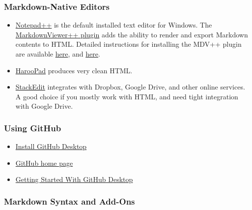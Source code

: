 \documentclass[
]{article}
\providecommand{\tightlist}{%
  \setlength{\itemsep}{0pt}\setlength{\parskip}{0pt}}
\begin{document}
\hypertarget{markdown-native-editors}{%
\subsubsection{Markdown-Native Editors}\label{markdown-native-editors}}

\begin{itemize}
\tightlist
\item
  \href{https://notepad-plus-plus.org/}{Notepad++} is the default
  installed text editor for Windows. The
  \href{https://github.com/nea/MarkdownViewerPlusPlus}{MarkdownViewer++
  plugin} adds the ability to render and export Markdown contents to
  HTML. Detailed instructions for installing the MDV++ plugin are
  available
  \href{https://adamtheautomator.com/convert-markdown-to-html/}{here},
  and
  \href{https://techwombat.com/how-to-install-markdownviewer-plus-plus-plugin-notepad-plus-plus/}{here}.
\item
  \href{http://pad.haroopress.com/}{HarooPad} produces very clean HTML.
\item
  \href{https://stackedit.io/}{StackEdit} integrates with Dropbox,
  Google Drive, and other online services. A good choice if you mostly
  work with HTML, and need tight integration with Google Drive.
\end{itemize}

\hypertarget{using-github}{%
\subsubsection{Using GitHub}\label{using-github}}

\begin{itemize}
\tightlist
\item
  \href{https://desktop.github.com/}{Install GitHub Desktop}
\item
  \href{https://github.com/}{GitHub home page}
\item
  \href{https://docs.github.com/en/desktop/installing-and-configuring-github-desktop/overview/getting-started-with-github-desktop}{Getting
  Started With GitHub Desktop}
\end{itemize}

\hypertarget{markdown-syntax-and-add-ons}{%
\subsubsection{Markdown Syntax and
Add-Ons}\label{markdown-syntax-and-add-ons}}
\end{document}
